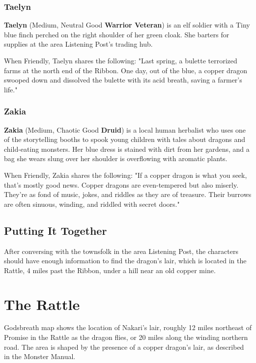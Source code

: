 \documentclass[letterpaper, 11pt, twocolumn]{dndbook}
\begin{document}
\subsubsection{Taelyn}

\textbf{Taelyn} (Medium, Neutral Good \textbf{Warrior Veteran}) is an elf soldier with a Tiny blue finch perched on the right shoulder of her green cloak. She barters for supplies at the area Listening Post's trading hub.

When Friendly, Taelyn shares the following: "Last spring, a bulette terrorized farms at the north end of the Ribbon. One day, out of the blue, a copper dragon swooped down and dissolved the bulette with its acid breath, saving a farmer's life."

\subsubsection{Zakia}

\textbf{Zakia} (Medium, Chaotic Good \textbf{Druid}) is a local human herbalist who uses one of the storytelling booths to spook young children with tales about dragons and child-eating monsters. Her blue dress is stained with dirt from her gardens, and a bag she wears slung over her shoulder is overflowing with aromatic plants.

When Friendly, Zakia shares the following: "If a copper dragon is what you seek, that's mostly good news. Copper dragons are even-tempered but also miserly. They're as fond of music, jokes, and riddles as they are of treasure. Their burrows are often sinuous, winding, and riddled with secret doors."


\subsection{Putting It Together}

After conversing with the townsfolk in the area Listening Post, the characters should have enough information to find the dragon's lair, which is located in the Rattle, 4 miles past the Ribbon, under a hill near an old copper mine.
\section{The Rattle}



Godsbreath map shows the location of Nakari's lair, roughly 12 miles northeast of Promise in the Rattle as the dragon flies, or 20 miles along the winding northern road. The area is shaped by the presence of a copper dragon's lair, as described in the Monster Manual.
\end{document}
